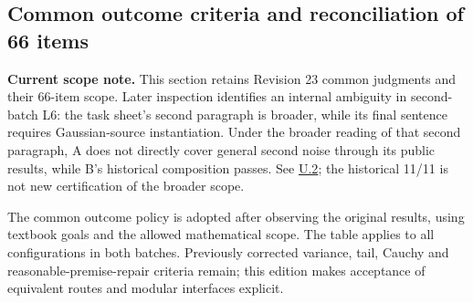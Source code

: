 \subsection[Common outcome criteria and reconciliation of 66 items]{\texorpdfstring{\protect\hypertarget{q2}{}Common outcome criteria and reconciliation of 66 items}{Common outcome criteria and reconciliation of 66 items}}
\textbf{Current scope note.} This section retains Revision 23 common judgments and their 66-item scope. Later inspection identifies an internal ambiguity in second-batch L6: the task sheet's second paragraph is broader, while its final sentence requires Gaussian-source instantiation. Under the broader reading of that second paragraph, A does not directly cover general second noise through its public results, while B's historical composition passes. See \hyperlink{u2}{U.2}; the historical 11/11 is not new certification of the broader scope.

The common outcome policy is adopted after observing the original results, using textbook goals and the allowed mathematical scope. The table applies to all configurations in both batches. Previously corrected variance, tail, Cauchy and reasonable-premise-repair criteria remain; this edition makes acceptance of equivalent routes and modular interfaces explicit.

